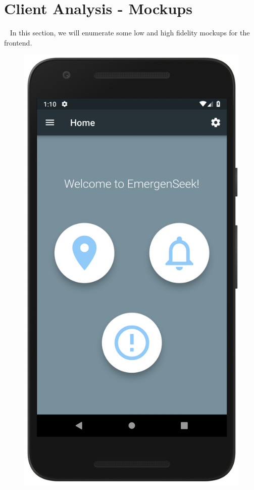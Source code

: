 \documentclass[10pt, a4paper]{article}
\begin{document}
\section{Client Analysis - Mockups}
\par ~ In this section, we will enumerate some low and high fidelity mockups for the frontend.


\begin{figure}[H]
  \includegraphics[width=\linewidth]{demo_home.png}

\end{figure}
\end{document}
